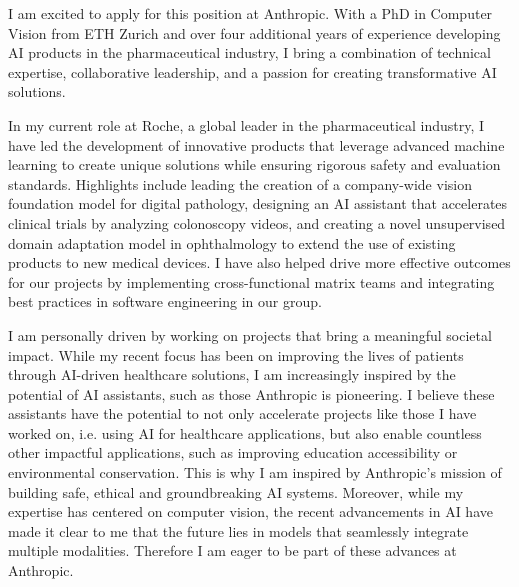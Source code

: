 \documentclass[10pt, letter]{ag-cv} %
\begin{document}
\makecvheader %

\makelettertitlenorec %


\begin{cvletter}






\begin{flushleft}
I am excited to apply for this position at Anthropic. With a PhD in Computer Vision from ETH Zurich and over four additional years of experience developing AI products in the pharmaceutical industry, I bring a combination of technical expertise, collaborative leadership, and a passion for creating transformative AI solutions. 

In my current role at Roche, a global leader in the pharmaceutical industry, I have led the development of innovative products that leverage advanced machine learning to create unique solutions while ensuring rigorous safety and evaluation standards. Highlights include leading the creation of a company-wide vision foundation model for digital pathology, designing an AI assistant that accelerates clinical trials by analyzing colonoscopy videos, and creating a novel unsupervised domain adaptation model in ophthalmology to extend the use of existing products to new medical devices. I have also helped drive more effective outcomes for our projects by implementing cross-functional matrix teams and integrating best practices in software engineering in our group.

I am personally driven by working on projects that bring a meaningful societal impact. While my recent focus has been on improving the lives of patients through AI-driven healthcare solutions, I am increasingly inspired by the potential of AI assistants, such as those Anthropic is pioneering. I believe these assistants have the potential to not only accelerate projects like those I have worked on, i.e. using AI for healthcare applications, but also enable countless other impactful applications, such as improving education accessibility or environmental conservation. This is why I am inspired by Anthropic’s mission of building safe, ethical and groundbreaking AI systems. Moreover, while my expertise has centered on computer vision, the recent advancements in AI have made it clear to me that the future lies in models that seamlessly integrate multiple modalities. Therefore I am eager to be part of these advances at Anthropic.


\end{flushleft}
\end{cvletter}
\end{document}
